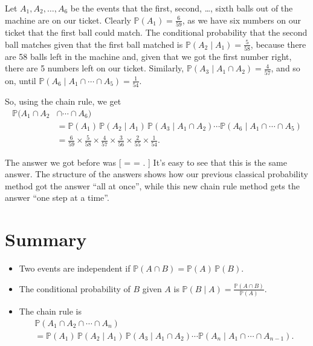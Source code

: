 \documentclass[
  letterpaper,
]{report}
\providecommand{\tightlist}{%
  \setlength{\itemsep}{0pt}\setlength{\parskip}{0pt}}\usepackage{longtable,booktabs,array}
\theoremstyle{definition}
\theoremstyle{definition}
\theoremstyle{remark}
\begin{document}
Let \(A_1, A_2, \dots, A_6\) be the events that the first, second,
\ldots, sixth balls out of the machine are on our ticket. Clearly
\(\mathbb P(A_1) = \frac{6}{59}\), as we have six numbers on our ticket
that the first ball could match. The conditional probability that the
second ball matches given that the first ball matched is
\(\mathbb P(A_2 \mid A_1) = \frac{5}{58}\), because there are 58 balls
left in the machine and, given that we got the first number right, there
are 5 numbers left on our ticket. Similarly,
\(\mathbb P(A_3 \mid A_1 \cap A_2) = \frac{4}{57}\), and so on, until
\(\mathbb P(A_6 \mid A_1 \cap \cdots\cap A_5) = \frac{1}{54}\).

So, using the chain rule, we get \begin{align*}
\mathbb P(A_1 \cap A_2 &\cap \cdots \cap A_6) \\
&= \mathbb P(A_1) \, \mathbb P(A_2 \mid A_1) \, \mathbb P(A_3 \mid A_1 \cap A_2) \cdots \mathbb P(A_6 \mid A_1 \cap \cdots \cap A_5) \\
&= \frac{6}{59} \times \frac{5}{58} \times \frac{4}{57} \times \frac{3}{56} \times \frac{2}{55} \times \frac{1}{54} .
\end{align*}

The answer we got before was {[}  =
=  . {]} It's easy to see that this is the
same answer. The structure of the answers shows how our previous
classical probability method got the answer ``all at once'', while this
new chain rule method gets the answer ``one step at a time''.

\hypertarget{summary-L07}{%
\section*{Summary}\label{summary-L07}}


\begin{itemize}
\tightlist
\item
  Two events are independent if
  \(\mathbb P(A \cap B) = \mathbb P(A)\, \mathbb P(B)\).
\item
  The conditional probability of \(B\) given \(A\) is
  \({\displaystyle \mathbb P(B \mid A) = \frac{\mathbb P(A \cap B)}{\mathbb P(A)}}\).
\item
  The chain rule is \begin{multline*}
  \mathbb P(A_1 \cap A_2 \cap \cdots \cap A_n) \\
  = \mathbb P(A_1) \, \mathbb P(A_2 \mid A_1) \, \mathbb P(A_3 \mid A_1 \cap A_2) \cdots \mathbb P(A_n \mid A_1 \cap \cdots \cap  A_{n-1}) . 
  \end{multline*}
\end{itemize}
\end{document}
